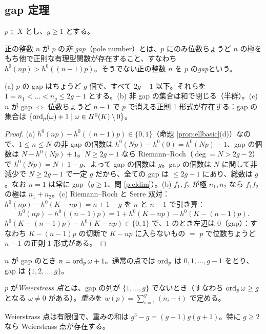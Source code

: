 \subsection{gap 定理}
$p\in X$ とし、$g\ge1$ とする。
\begin{defn}
正の整数 $n$ が $p$ の\emph{非 gap}（pole number）とは、$p$ にのみ位数ちょうど $n$ の極をもち他で正則な有理型関数が存在すること、すなわち $h^0(np)>h^0((n-1)p)$。そうでない正の整数 $n$ を $p$ の\emph{gap}という。
\end{defn}
\begin{thm}\label{thm:gap}
(a) $p$ の gap はちょうど $g$ 個で、すべて $2g-1$ 以下。それらを $1=n_1<\dots<n_g\le2g-1$ とする。(b) 非 gap の集合は和で閉じる（半群）。(c) $n$ が gap $\iff$ 位数ちょうど $n-1$ で $p$ で消える正則 1 形式が存在する：gap の集合は $\{\operatorname{ord}_p(\omega)+1\mid\omega\in H^0(K)\setminus0\}$。
\end{thm}
\begin{proof}
(a) $h^0(np)-h^0((n-1)p)\in\{0,1\}$（命題 \ref{prop:ellbasic}(d)）なので、$1\le n\le N$ の非 gap の個数は $h^0(Np)-h^0(0)=h^0(Np)-1$、gap の個数は $N-h^0(Np)+1$。$N\ge2g-1$ なら Riemann--Roch（$\deg=N>2g-2$）で $h^0(Np)=N+1-g$、よって gap の個数は $g$。gap の個数は $N$ に関して非減少で $N\ge2g-1$ で一定 $g$ だから、全ての gap は $\le2g-1$ にあり、総数は $g$。なお $n=1$ は常に gap（$g\ge1$、問 \ref{p:eldim}）。(b) $f_1,f_2$ が極 $n_1,n_2$ なら $f_1f_2$ の極は $n_1+n_2$。(c) Riemann--Roch と Serre 双対：$h^0(np)-h^0(K-np)=n+1-g$ を $n$ と $n-1$ で引き算：
\[
h^0(np)-h^0((n-1)p)=1+h^0(K-np)-h^0(K-(n-1)p).
\]
$h^0(K-(n-1)p)-h^0(K-np)\in\{0,1\}$ で、$1$ のとき左辺は $0$（gap）：すなわち $K-(n-1)p$ の切断で $K-np$ に入らないもの $=$ $p$ で位数ちょうど $n-1$ の正則 1 形式がある。 
\end{proof}
$n$ が gap のとき $n=\operatorname{ord}_p\omega+1$。通常の点では $\operatorname{ord}_p$ は $0,1,\dots,g-1$ をとり、gap は $\{1,2,\dots,g\}$。

\begin{defn}[Weierstrass 点]
$p$ が\emph{Weierstrass 点}とは、gap の列が $\{1,\dots,g\}$ でないとき（すなわち $\operatorname{ord}_p\omega\ge g$ となる $\omega\ne0$ がある）。\emph{重み}を $w(p)=\sum_{i=1}^g(n_i-i)$ で定める。
\end{defn}
\begin{thm}
Weierstrass 点は有限個で、重みの和は $g^3-g=(g-1)g(g+1)$。特に $g\ge2$ なら Weierstrass 点が存在する。
\end{thm}

